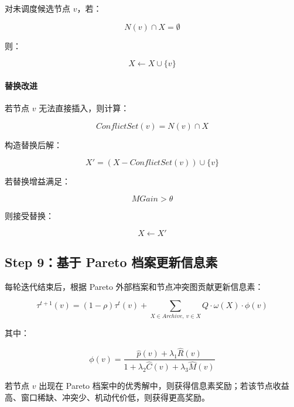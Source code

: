 \documentclass[UTF8,a4paper,12pt]{ctexart}
\begin{document}
对未调度候选节点 $v$，若：

\begin{equation}
N(v)\cap X=\emptyset
\end{equation}

则：

\begin{equation}
X\leftarrow X\cup\{v\}
\end{equation}

\paragraph{替换改进}

若节点 $v$ 无法直接插入，则计算：

\begin{equation}
ConflictSet(v)=N(v)\cap X
\end{equation}

构造替换后解：

\begin{equation}
X'=(X-ConflictSet(v))\cup\{v\}
\end{equation}

若替换增益满足：

\begin{equation}
MGain>\theta
\end{equation}

则接受替换：

\begin{equation}
X\leftarrow X'
\end{equation}

\subsection{Step 9：基于 Pareto 档案更新信息素}

每轮迭代结束后，根据 Pareto 外部档案和节点冲突图贡献更新信息素：

\begin{equation}
\tau^{t+1}(v)
=
(1-\rho)\tau^t(v)
+
\sum_{X\in Archive,\ v\in X}
Q\cdot \omega(X)\cdot \phi(v)
\end{equation}

其中：

\begin{equation}
\phi(v)=
\frac{\hat{p}(v)+\lambda_1\hat{R}(v)}
{1+\lambda_2\hat{C}(v)+\lambda_3\hat{M}(v)}
\end{equation}

若节点 $v$ 出现在 Pareto 档案中的优秀解中，则获得信息素奖励；若该节点收益高、窗口稀缺、冲突少、机动代价低，则获得更高奖励。
\end{document}
